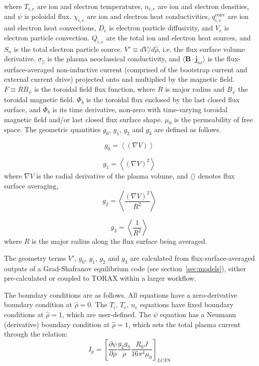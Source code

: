 \documentclass[aps, reprint, nofootinbib]{revtex4-2}
\newcommand{\rnorm}{\hat{\rho}}
\newcommand{\phibdot}{\dot{\Phi}_b}
\newcommand{\phib}{\Phi_b}
\begin{document}
where $T_{i,e}$ are ion and electron temperatures, $n_{i,e}$ are ion and electron densities, and $\psi$ is poloidal flux. $\chi_{i,e}$ are ion and electron heat conductivities, $q_{i,e}^{\mathrm{conv}}$ are ion and electron heat convections, $D_e$ is electron particle diffusivity, and $V_e$ is electron particle convection. $Q_{i,e}$ are the total ion and electron heat sources, and $S_n$ is the total electron particle source. $V' \equiv dV/d\rnorm$, i.e. the flux surface volume derivative. $\sigma_{||}$ is the plasma neoclassical conductivity, and $\langle \mathbf{B} \cdot \mathbf{j}_{ni} \rangle$ is the flux-surface-averaged non-inductive current (comprised of the bootstrap current and external current drive) projected onto and multiplied by the magnetic field. $F \equiv RB_\varphi$ is the toroidal field flux function, where $R$ is major radius and $B_\varphi$ the toroidal magnetic field. $\phib$ is the toroidal flux enclosed by the last closed flux surface, and $\phibdot$ is its time derivative, non-zero with time-varying toroidal magnetic field and/or last closed flux surface shape. $\mu_0$ is the permeability of free space. The geometric quantities $g_0$, $g_1$, $g_2$ and $g_3$ are defined as follows. 

\begin{equation}
\label{eq:g0}
g_0 = \left< \left( \nabla V \right) \right> 
\end{equation}

\begin{equation}
\label{eq:g1}
g_1 = \left< \left( \nabla V \right)^2 \right> 
\end{equation}
where $\nabla V$ is the radial derivative of the plasma volume, and $\langle \rangle$ denotes flux surface averaging,
%
\begin{equation}
\label{eq:g2}
g_2 = \left< \frac{\left( \nabla V \right)^2}{R^2}\right> 
\end{equation}

\begin{equation}
\label{eq:g3}
g_3 = \left< \frac{1}{R^2}\right>
\end{equation}
%
where $R$ is the major radius along the flux surface being averaged.

The geometry terms $V'$, $g_0$, $g_1$, $g_2$ and $g_3$ are calculated from flux-surface-averaged outputs of a Grad-Shafranov equilibrium code (see section~\ref{sec:models}), either pre-calculated or coupled to TORAX within a larger workflow.

The boundary conditions are as follows. All equations have a zero-derivative boundary condition at $\rnorm=0$. The $T_i$, $T_e$, $n_e$ equations have fixed boundary conditions at $\rnorm=1$, which are user-defined. The $\psi$ equation has a Neumann (derivative) boundary condition at $\rnorm=1$, which sets the total plasma current through the relation:
\begin{equation}
    I_p = \left[\frac{\partial \psi}{\partial \rho} \frac{g_2 g_3}{\rho}\frac{R_0 J}{16\pi^4\mu_0}\right]_{LCFS}
\end{equation}
\end{document}
